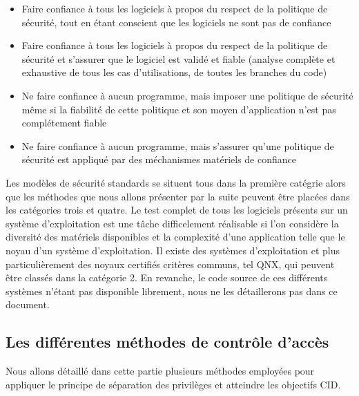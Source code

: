 \begin{itemize}
  \item Faire confiance à tous les logiciels à propos du respect de la politique de sécurité, tout en étant conscient que les logiciels ne sont pas de confiance %
  \item Faire confiance à tous les logiciels à propos du respect de la politique de sécurité et s'assurer que le logiciel est validé et fiable (analyse complète et exhaustive de tous les cas d'utilisations, de toutes les branches du code) %
  \item Ne faire confiance à aucun programme, mais imposer une politique de sécurité même si la fiabilité de cette politique et son moyen d'application n'est pas complétement fiable%
  \item Ne faire confiance à aucun programme, mais s'assurer qu'une politique de sécurité est appliqué par des méchanismes matériels de confiance%
\end{itemize}

Les modèles de sécurité standards se situent tous dans la première catégrie alors que les méthodes que nous allons présenter par la suite peuvent être placées dans les catégories trois et quatre. Le test complet de tous les logiciels présents sur un système d'exploitation est une tâche difficelement réalisable si l'on considère la diversité des matériels disponibles et la complexité d'une application telle que le noyau d'un système d'exploitation. Il existe des systèmes d'exploitation et plus particulièrement des noyaux certifiés critères communs, tel QNX\cite{QNX}, qui peuvent être classés dans la catégorie 2. En revanche, le code source de ces différents systèmes n'étant pas disponible librement, nous ne les détaillerons pas dans ce document.

\subsection{Les différentes méthodes de contrôle d'accès}

Nous allons détaillé dans cette partie plusieurs méthodes employées pour appliquer le principe de séparation des privilèges et atteindre les objectifs CID.

